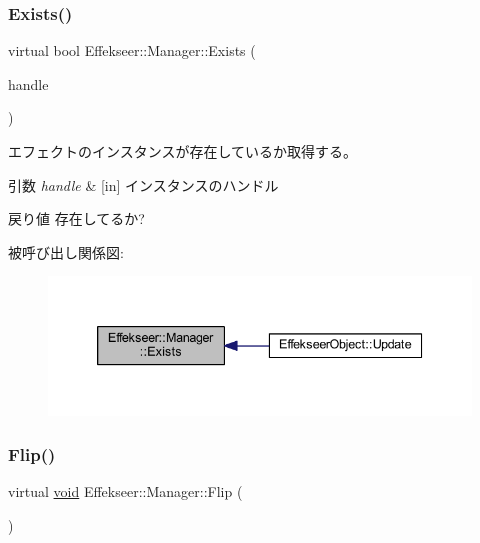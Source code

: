 \subsubsection{\texorpdfstring{Exists()}{Exists()}}
{\footnotesize\ttfamily virtual bool Effekseer\+::\+Manager\+::\+Exists (\begin{DoxyParamCaption}\item[{\mbox{\hyperlink{namespace_effekseer_afba58b8d812da862190e9bbfc040824a}{Handle}}}]{handle }\end{DoxyParamCaption})\hspace{0.3cm}{\ttfamily [pure virtual]}}



エフェクトのインスタンスが存在しているか取得する。 


\begin{DoxyParams}{引数}
{\em handle} & \mbox{[}in\mbox{]} インスタンスのハンドル \\
\hline
\end{DoxyParams}
\begin{DoxyReturn}{戻り値}
存在してるか? 
\end{DoxyReturn}
被呼び出し関係図\+:\nopagebreak
\begin{figure}[H]
\begin{center}
\leavevmode
\includegraphics[width=339pt]{class_effekseer_1_1_manager_ad95297e9170c9f9874eb6bf951aa5dc0_icgraph}
\end{center}
\end{figure}
\mbox{\label{class_effekseer_1_1_manager_ab810f714df5d12c566664183f365cbf4}} 
\subsubsection{\texorpdfstring{Flip()}{Flip()}}
{\footnotesize\ttfamily virtual \mbox{\hyperlink{namespace_effekseer_ab34c4088e512200cf4c2716f168deb56}{void}} Effekseer\+::\+Manager\+::\+Flip (\begin{DoxyParamCaption}{ }\end{DoxyParamCaption})\hspace{0.3cm}{\ttfamily [pure virtual]}}



